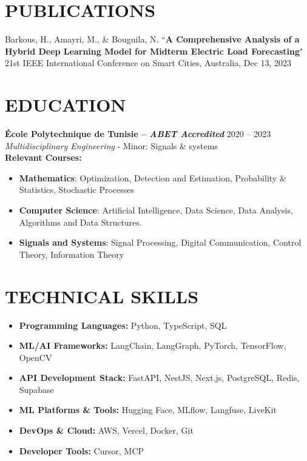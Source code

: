 \documentclass[a4paper,9pt]{extarticle}
\begin{document}
\section*{PUBLICATIONS}
\noindent Barkous, H., Amayri, M., \& Bouguila, N. ``\textbf{A Comprehensive Analysis of a Hybrid Deep Learning Model for Midterm Electric Load Forecasting}" 21st IEEE International Conference on Smart Cities, Australia, Dec 13, 2023

\section*{EDUCATION}
\textbf{École Polytechnique de Tunisie -- \textit{ABET Accredited}}
\hfill 2020 -- 2023\\ 
\textit{Multidisciplinary Engineering} - Minor: Signals \& systems \\
\textbf{Relevant Courses:}
\begin{itemize}
    \item \textbf{Mathematics}: Optimization, Detection and Estimation, Probability \& Statistics, Stochastic Processes
    \item \textbf{Computer Science}: Artificial Intelligence, Data Science, Data Analysis, Algorithms and Data Structures.
    \item \textbf{Signals and Systems}: Signal Processing, Digital Communication, Control Theory, Information Theory
\end{itemize}

\section*{TECHNICAL SKILLS}
\begin{itemize}
    \item \textbf{Programming Languages:} Python, TypeScript, SQL
    \item \textbf{ML/AI Frameworks:} LangChain, LangGraph, PyTorch, TensorFlow, OpenCV
    \item \textbf{API Development Stack:} FastAPI, NestJS, Next.js, PostgreSQL, Redis, Supabase
    \item \textbf{ML Platforms \& Tools:} Hugging Face, MLflow, Langfuse, LiveKit
    \item \textbf{DevOps \& Cloud:} AWS, Vercel, Docker, Git
    \item \textbf{Developer Tools:} Cursor, MCP
\end{itemize}

\end{document}
